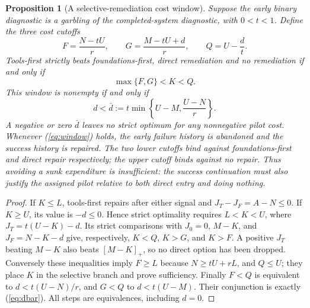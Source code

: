 \documentclass[11pt]{article}
\newtheorem{proposition}{Proposition}
\begin{document}
\begin{proposition}[A selective-remediation cost window]\label{prop:window}
Suppose the early binary diagnostic is a garbling of the completed-system diagnostic, with $0<t<1$. Define the three cost cutoffs
\begin{equation}
 F=\frac{N-tU}{r},\qquad G=\frac{M-tU+d}{r},\qquad Q=U-\frac d t.\label{eq:FGQ}
\end{equation}
Tools-first strictly beats foundations-first, direct remediation \emph{and} no remediation if and only if
\begin{equation}
 \boxed{\quad \max\{F,G\}<K<Q.\quad}\label{eq:window}
\end{equation}
This window is nonempty if and only if
\begin{equation}
 d<\bar d:=t\min\left\{U-M,\frac{U-N}{r}\right\}.\label{eq:dbar}
\end{equation}
A negative or zero $\bar d$ leaves no strict optimum for any nonnegative pilot cost. Whenever (\ref{eq:window}) holds, the early failure history is abandoned and the success history is repaired. The two lower cutoffs bind against foundations-first and direct repair respectively; the upper cutoff binds against no repair. Thus avoiding a sunk expenditure is insufficient: the success continuation must also justify the assigned pilot relative to both direct entry and doing nothing.
\end{proposition}
\begin{proof}
If $K\leq L$, tools-first repairs after either signal and $J_T-J_F=A-N\leq0$. If $K\geq U$, its value is $-d\leq0$. Hence strict optimality requires $L<K<U$, where $J_T=t(U-K)-d$. Its strict comparisons with $J_0=0$, $M-K$, and $J_F=N-K-d$ give, respectively, $K<Q$, $K>G$, and $K>F$. A positive $J_T$ beating $M-K$ also beats $[M-K]_+$, so no direct option has been dropped. Conversely these inequalities imply $F\geq L$ because $N\geq tU+rL$, and $Q\leq U$; they place $K$ in the selective branch and prove sufficiency. Finally $F<Q$ is equivalent to $d<t(U-N)/r$, and $G<Q$ to $d<t(U-M)$. Their conjunction is exactly (\ref{eq:dbar}). All steps are equivalences, including $d=0$.
\end{proof}
\end{document}
